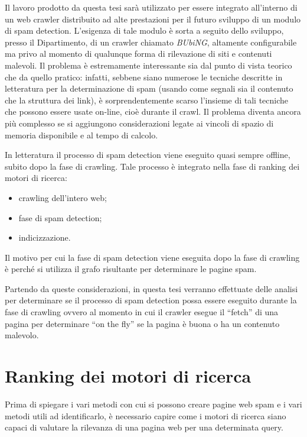 Il lavoro prodotto da questa tesi sarà utilizzato per essere integrato	all'interno di un web crawler distribuito ad alte prestazioni per il futuro sviluppo di un modulo di spam detection. L'esigenza di tale modulo è sorta a seguito dello sviluppo, presso il Dipartimento, di un crawler chiamato {\itshape BUbiNG}, altamente configurabile ma privo al momento di qualunque forma di rilevazione di siti e contenuti malevoli. Il problema è estremamente interessante sia dal punto di vista teorico che da quello pratico: infatti, sebbene siano numerose le tecniche descritte in letteratura per la determinazione di spam (usando come segnali sia il contenuto che la struttura dei link), è sorprendentemente scarso l'insieme di tali tecniche che possono essere usate on-line, cioè durante il crawl. Il problema diventa ancora più complesso se si aggiungono considerazioni legate ai vincoli di spazio di memoria disponibile e al tempo di calcolo. 

In letteratura il processo di spam detection viene eseguito quasi sempre offline, subito dopo la fase di crawling. Tale processo è integrato nella fase di ranking dei motori di ricerca:
\begin{itemize}
 \item crawling dell'intero web;
 \item fase di spam detection;
 \item indicizzazione.
\end{itemize}
Il motivo per cui la fase di spam detection viene eseguita dopo la fase di crawling è perché si utilizza il grafo risultante per determinare le pagine spam. 

Partendo da queste considerazioni, in questa tesi verranno effettuate delle analisi per determinare se il processo di spam detection possa essere eseguito durante la fase di crawling ovvero al momento in cui il crawler esegue il ``fetch'' di una pagina per determinare ``on the fly'' se la pagina è buona o ha un contenuto malevolo. 

\section{Ranking dei motori di ricerca}
Prima di spiegare i vari metodi con cui si possono creare pagine web spam e i vari metodi utili ad identificarlo, è necessario capire come i motori di ricerca siano capaci di valutare la rilevanza di una pagina web per una determinata query.

